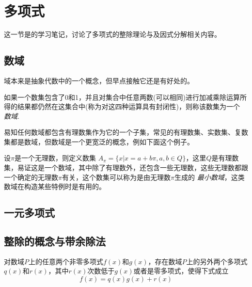 
\section{多项式}
\label{sec:polynome}

这一节是\cite{advanced-algebra}的学习笔记，讨论了多项式的整除理论与及因式分解相关内容。

\subsection{数域}
\label{sec:number-field}

域本来是抽象代数中的一个概念，但早点接触它还是有好处的。

\begin{definition}
  如果一个数集包含了0和1，并且对集合中任意两数(可以相同)进行加减乘除运算所得的结果都仍然在这集合中(称为对这四种运算具有封闭性)，则称该数集为一个 \emph{数域}.
\end{definition}

易知任何数域都包含有理数集作为它的一个子集，常见的有理数集、实数集、复数集都是数域，但数域是一个更宽泛的概念，例如下面这个例子。

\begin{example}
  设$\pi$是一个无理数，则定义数集 $A_{\pi} = \{x|x=a+b\pi,a,b\in Q\}$，这里$Q$是有理数集，易证这是一个数域，其中除了有理数外，还包含一些无理数，这些无理数都跟一个确定的无理数$\pi$有关，这个数集可以称为是由无理数$\pi$生成的 \emph{最小数域}，这类数域在构造某些特例时是有用的。
\end{example}

\subsection{一元多项式}
\label{sec:polynome-with-one-variable}



\subsection{整除的概念与带余除法}
\label{sec:polynome-integer-division-and-devision-with-remainder}

\begin{theorem}[带余除法]
  对数域$P$上的任意两个非零多项式$f(x)$和$g(x)$，存在数域$P$上的另外两个多项式$q(x)$和$r(x)$，其中$r(x)$次数低于$g(x)$或者是零多项式，使得下式成立
  \[ f(x) = q(x) g(x) + r(x) \]
\end{theorem}

